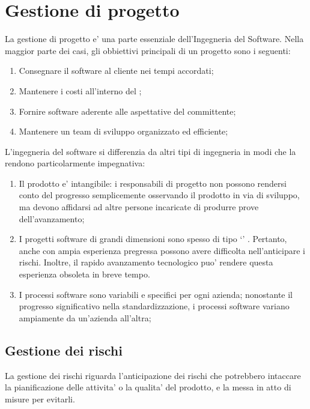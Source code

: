 \section{Gestione di progetto}

La gestione di progetto e' una parte essenziale dell'Ingegneria del Software.
Nella maggior parte dei casi, gli obbiettivi principali di un progetto sono i
seguenti:

\begin{enumerate}
  \item Consegnare il software al cliente nei tempi accordati;
  \item Mantenere i costi all'interno del ;
  \item Fornire software aderente alle aspettative del committente;
  \item Mantenere un team di sviluppo organizzato ed efficiente;
\end{enumerate}

L'ingegneria del software si differenzia da altri tipi di ingegneria in modi che
la rendono particolarmente impegnativa:

\begin{enumerate}
  \item Il prodotto e' intangibile: i responsabili di progetto non possono
    rendersi conto del progresso semplicemente osservando il prodotto in via di
    sviluppo, ma devono affidarsi ad altre persone incaricate di produrre prove
    dell'avanzamento;
  \item I progetti software di grandi dimensioni sono spesso di tipo
    `' . Pertanto, anche
     con ampia esperienza pregressa possono avere
    difficolta nell'anticipare i rischi. Inoltre, il rapido avanzamento
    tecnologico puo' rendere questa esperienza obsoleta in breve tempo.
  \item I processi software sono variabili e specifici per ogni azienda;
    nonostante il progresso significativo nella standardizzazione, i processi
    software variano ampiamente da un'azienda all'altra;
\end{enumerate}

\subsection{Gestione dei rischi}

La gestione dei rischi riguarda l'anticipazione dei rischi che potrebbero
intaccare la pianificazione delle attivita' o la qualita' del prodotto, e la
messa in atto di misure per evitarli.

